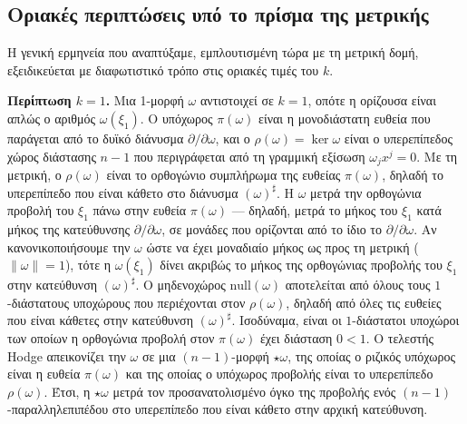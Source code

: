 \documentclass[12pt]{article}
\begin{document}
\subsection{Οριακές περιπτώσεις υπό το πρίσμα της μετρικής}

Η γενική ερμηνεία που αναπτύξαμε, εμπλουτισμένη τώρα με τη μετρική δομή, εξειδικεύεται με διαφωτιστικό τρόπο στις οριακές τιμές του $k$.

\textbf{Περίπτωση $k=1$.} Μια 1-μορφή $\omega$ αντιστοιχεί σε $k=1$, οπότε η ορίζουσα είναι απλώς ο αριθμός $\omega(\xi_1)$. Ο υπόχωρος $\pi(\omega)$ είναι η μονοδιάστατη ευθεία που παράγεται από το δυϊκό διάνυσμα $\partial / \partial \omega$, και ο $\rho(\omega) = \ker \omega$ είναι ο υπερεπίπεδος χώρος διάστασης $n-1$ που περιγράφεται από τη γραμμική εξίσωση $\omega_j x^j = 0$. Με τη μετρική, ο $\rho(\omega)$ είναι το ορθογώνιο συμπλήρωμα της ευθείας $\pi(\omega)$, δηλαδή το υπερεπίπεδο που είναι κάθετο στο διάνυσμα $(\omega)^\sharp$. Η $\omega$ μετρά την ορθογώνια προβολή του $\xi_1$ πάνω στην ευθεία $\pi(\omega)$ — δηλαδή, μετρά το μήκος του $\xi_1$ κατά μήκος της κατεύθυνσης $\partial / \partial \omega$, σε μονάδες που ορίζονται από το ίδιο το $\partial / \partial \omega$. Αν κανονικοποιήσουμε την $\omega$ ώστε να έχει μοναδιαίο μήκος ως προς τη μετρική ($\|\omega\| = 1$), τότε η $\omega(\xi_1)$ δίνει ακριβώς το μήκος της ορθογώνιας προβολής του $\xi_1$ στην κατεύθυνση $(\omega)^\sharp$. Ο μηδενοχώρος $\text{null}(\omega)$ αποτελείται από όλους τους $1$-διάστατους υποχώρους που περιέχονται στον $\rho(\omega)$, δηλαδή από όλες τις ευθείες που είναι κάθετες στην κατεύθυνση $(\omega)^\sharp$. Ισοδύναμα, είναι οι $1$-διάστατοι υποχώροι των οποίων η ορθογώνια προβολή στον $\pi(\omega)$ έχει διάσταση $0 < 1$. Ο τελεστής Hodge απεικονίζει την $\omega$ σε μια $(n-1)$-μορφή $\star \omega$, της οποίας ο ριζικός υπόχωρος είναι η ευθεία $\pi(\omega)$ και της οποίας ο υπόχωρος προβολής είναι το υπερεπίπεδο $\rho(\omega)$. Έτσι, η $\star \omega$ μετρά τον προσανατολισμένο όγκο της προβολής ενός $(n-1)$-παραλληλεπιπέδου στο υπερεπίπεδο που είναι κάθετο στην αρχική κατεύθυνση.
\end{document}
